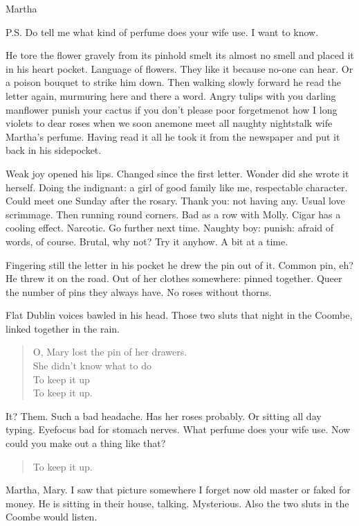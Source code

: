    Martha

P.S. Do tell me what kind of perfume does your wife use.
I want to know.


He tore the flower gravely from its pinhold
smelt its almost no smell
and placed it in his heart pocket.
Language of flowers.
They like it
because no-one can hear.
Or a poison bouquet to strike him down.
Then walking slowly forward
he read the letter again,
murmuring here and there a word.
Angry tulips with you darling manflower
punish your cactus if you don't
please poor forgetmenot
how I long violets to dear roses
when we
soon anemone meet
all naughty nightstalk
wife Martha's perfume.
Having read it all
he took it from the newspaper and put it back in his sidepocket.

Weak joy opened his lips.
Changed since the first letter.
Wonder did she wrote it herself.
Doing the indignant:
a girl of good family like me, respectable character.
Could meet one Sunday after the rosary.
Thank you: not having any.
Usual love scrimmage.
Then running round corners.
Bad as a row with Molly.
Cigar has a cooling effect.
Narcotic.
Go further next time.
Naughty boy:
punish:
afraid of words, of course.
Brutal, why not?
Try it anyhow.
A bit at a time.

Fingering still the letter in his pocket
he drew the pin out of it.
Common pin, eh?
He threw it on the road.
Out of her clothes somewhere:
pinned together.
Queer the number of pins they always have.
No roses without thorns.

Flat Dublin voices bawled in his head.
Those two sluts that night in the Coombe, linked together in the rain.

\begin{verse}
    O, Mary lost the pin of her drawers. \\
    She didn't know what to do \\
    To keep it up \\
    To keep it up.
\end{verse}


It?
Them.
Such a bad headache.
Has her roses probably.
Or sitting all day typing.
Eyefocus bad for stomach nerves.
What perfume does your wife use.
Now could you make out a thing like that?

\begin{verse}
    To keep it up.
\end{verse}

Martha, Mary.
I saw that picture somewhere I forget now
old master or faked for money.
He is sitting in their house, talking.
Mysterious.
Also the two sluts in the Coombe would listen.

